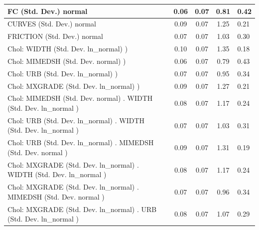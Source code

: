 \begin{table}
\begin{center}
\begin{tabular}{|l|l|c|c|c|l|}
			FC (Std. Dev.) normal &  & 0.06 & 0.07 & 0.81 & 0.42 \\
			\hline
			CURVES (Std. Dev.) normal &  & 0.09 & 0.07 & 1.25 & 0.21 \\
			\hline
			FRICTION (Std. Dev.) normal &  & 0.07 & 0.07 & 1.03 & 0.30 \\
			\hline
			 Chol: WIDTH (Std. Dev. ln_normal) ) &  & 0.10 & 0.07 & 1.35 & 0.18 \\
			\hline
			 Chol: MIMEDSH (Std. Dev. normal) ) &  & 0.06 & 0.07 & 0.79 & 0.43 \\
			\hline
			 Chol: URB (Std. Dev. ln_normal) ) &  & 0.07 & 0.07 & 0.95 & 0.34 \\
			\hline
			 Chol: MXGRADE (Std. Dev. ln_normal) ) &  & 0.09 & 0.07 & 1.27 & 0.21 \\
			\hline
			 Chol: MIMEDSH (Std. Dev. normal) . WIDTH (Std. Dev.   ln_normal ) &  & 0.08 & 0.07 & 1.17 & 0.24 \\
			\hline
			 Chol: URB (Std. Dev. ln_normal) . WIDTH (Std. Dev.   ln_normal ) &  & 0.07 & 0.07 & 1.03 & 0.31 \\
			\hline
			 Chol: URB (Std. Dev. ln_normal) . MIMEDSH (Std. Dev.   normal ) &  & 0.09 & 0.07 & 1.31 & 0.19 \\
			\hline
			 Chol: MXGRADE (Std. Dev. ln_normal) . WIDTH (Std. Dev.   ln_normal ) &  & 0.08 & 0.07 & 1.17 & 0.24 \\
			\hline
			 Chol: MXGRADE (Std. Dev. ln_normal) . MIMEDSH (Std. Dev.   normal ) &  & 0.07 & 0.07 & 0.96 & 0.34 \\
			\hline
			 Chol: MXGRADE (Std. Dev. ln_normal) . URB (Std. Dev.   ln_normal ) &  & 0.08 & 0.07 & 1.07 & 0.29 \\
			\hline
		\end{tabular}
	\end{center}
\end{table}